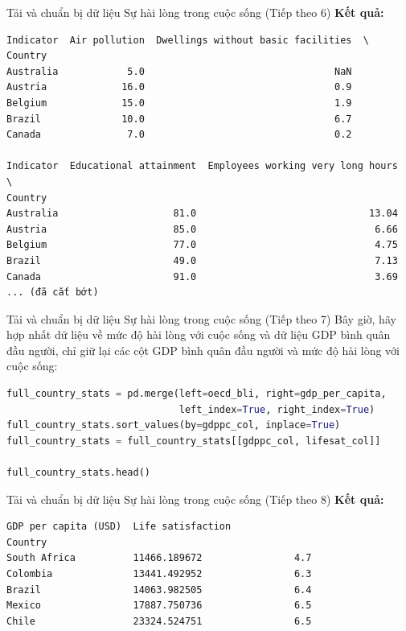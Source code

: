 \documentclass[aspectratio=169]{beamer}
\begin{document}
\begin{frame}[fragile]{Tải và chuẩn bị dữ liệu Sự hài lòng trong cuộc sống (Tiếp theo 6)}
\textbf{Kết quả:}
\begin{verbatim}
Indicator  Air pollution  Dwellings without basic facilities  \
Country                                                        
Australia            5.0                                 NaN   
Austria             16.0                                 0.9   
Belgium             15.0                                 1.9   
Brazil              10.0                                 6.7   
Canada               7.0                                 0.2   

Indicator  Educational attainment  Employees working very long hours  \
Country                                                                
Australia                    81.0                              13.04   
Austria                      85.0                               6.66   
Belgium                      77.0                               4.75   
Brazil                       49.0                               7.13   
Canada                       91.0                               3.69   
... (đã cắt bớt)
\end{verbatim}


\end{frame}

\begin{frame}[fragile]{Tải và chuẩn bị dữ liệu Sự hài lòng trong cuộc sống (Tiếp theo 7)}
Bây giờ, hãy hợp nhất dữ liệu về mức độ hài lòng với cuộc sống và dữ liệu GDP bình quân đầu người, chỉ giữ lại các cột GDP bình quân đầu người và mức độ hài lòng với cuộc sống:

\begin{lstlisting}[language=Python]
full_country_stats = pd.merge(left=oecd_bli, right=gdp_per_capita,
                              left_index=True, right_index=True)
full_country_stats.sort_values(by=gdppc_col, inplace=True)
full_country_stats = full_country_stats[[gdppc_col, lifesat_col]]

full_country_stats.head()
\end{lstlisting}


\end{frame}

\begin{frame}[fragile]{Tải và chuẩn bị dữ liệu Sự hài lòng trong cuộc sống (Tiếp theo 8)}
\textbf{Kết quả:}
\begin{verbatim}
GDP per capita (USD)  Life satisfaction
Country                                              
South Africa          11466.189672                4.7
Colombia              13441.492952                6.3
Brazil                14063.982505                6.4
Mexico                17887.750736                6.5
Chile                 23324.524751                6.5
\end{verbatim}


\end{frame}
\end{document}
